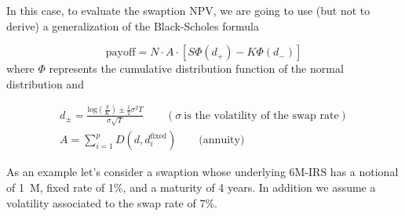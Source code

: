 In this case, to evaluate the swaption NPV, we are going to use (but not 
to derive) a generalization of the Black-Scholes formula

\begin{equation}
\mathrm{payoff} = N\cdot A\cdot [S \Phi(d_+) - K\Phi(d_-)]
\end{equation}
where $\Phi$ represents the cumulative distribution function of the normal distribution and

\begin{equation}
\begin{gathered}d_{\pm} = \frac{\mathrm{log}(\frac{S}{K}) \pm \frac{1}{2}\sigma^{2}T}{\sigma\sqrt{T}}\qquad(\sigma~\textrm{is the volatility of the swap rate})\\
A =\sum_{i=1}^{p}D(d, d_{i}^{\mathrm{fixed}})\qquad\mathrm{(annuity})
\end{gathered}
\end{equation}

As an example let's consider a swaption whose underlying 6M-IRS has a
notional of 1~M, fixed rate of 1\%, and a maturity of 4 years. In
addition we assume a volatility associated to the swap rate of 7\%.

